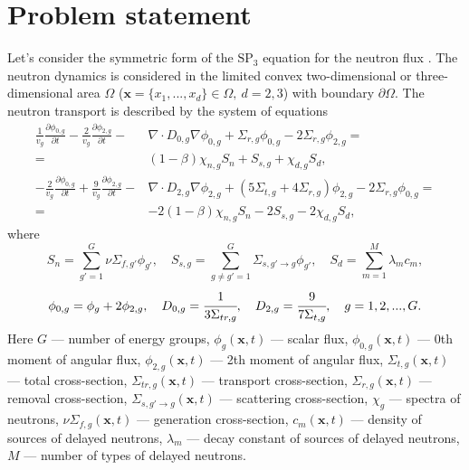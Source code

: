 \documentclass[a4paper]{jpconf}
\begin{document}
\section{Problem statement}
Let’s consider the symmetric form of the $\mathrm{SP_3}$ equation for the neutron flux \cite{ryu2013fem}.
The neutron dynamics is considered in the limited convex two-dimensional or three-dimensional area  $\Omega$ ($\bm x = \{x_1, ..., x_d\} \in \Omega, \ d = 2,3$) with boundary $\partial \Omega$. 
The neutron transport is described by the system of equations
\begin{equation}\label{1.1}
\begin{split}
 \frac{1}{v_g} \frac{\partial \phi_{0,g}}{\partial t} - \frac{2}{v_g} \frac{\partial \phi_{2,g}}{\partial t} - & \nabla \cdot D_{0,g} \nabla \phi_{0,g} + \Sigma_{r,g} \phi_{0,g} -  2\Sigma_{r,g} \phi_{2,g} = \\ 
 =  & (1-\beta)\chi_{n,g} S_{n} + S_{s,g} + \chi_{d,g} S_d, \\
 -\frac{2}{v_g} \frac{\partial \phi_{0,g}}{\partial t} + \frac{9}{v_g} \frac{\partial \phi_{2,g}}{\partial t} - & \nabla \cdot D_{2,g} \nabla \phi_{2,g} + (5\Sigma_{t,g} + 4\Sigma_{r,g}) \phi_{2,g} - 2\Sigma_{r,g} \phi_{0,g} = \\ 
 =  & -2(1-\beta)\chi_{n,g} S_{n} - 2S_{s,g} - 2\chi_{d,g} S_d,
\end{split}
\end{equation}
where
\[
S_{n} =  \sum_{g'=1}^{G} \nu \Sigma_{f,g'} \phi_{g'}, 
\quad
S_{s,g} = \sum_{g\neq g'=1}^{G} \Sigma_{s,g'\rightarrow g} \phi_{g'},
\quad
S_{d} = \sum_{m=1}^{M} \lambda_m c_m,
\]
\[
\phi_{0,g}=\phi_g + 2\phi_{2,g}, 
\quad
D_{0,g} = \cfrac{1}{3\Sigma_{tr,g}}, 
\quad
D_{2,g} = \cfrac{9}{7\Sigma_{t,g}}, 
\quad g=1,2,...,G.
\]
Here $G$ --- number of energy groups,
$\phi_g(\bm x, t)$ --- scalar flux,
$\phi_{0,g}(\bm x, t)$ --- 0th moment of angular flux,
$\phi_{2,g}(\bm x, t)$ --- 2th moment of angular flux,
$\Sigma_{t,g}(\bm x, t)$ --- total cross-section, 
$\Sigma_{tr,g}(\bm x, t)$ --- transport cross-section, 
$\Sigma_{r,g}(\bm x, t)$ --- removal cross-section,
$\Sigma_{s,g'\rightarrow g}(\bm x, t)$ --- scattering cross-section,
$\chi_g$  --- spectra of neutrons, 
$\nu\Sigma_{f,g}(\bm x, t)$ --- generation cross-section,
$c_m(\bm x, t)$ --- density of sources of delayed neutrons,
$\lambda_m$ --- decay constant of sources of delayed neutrons,
$M$ --- number of types of delayed neutrons.
\end{document}
